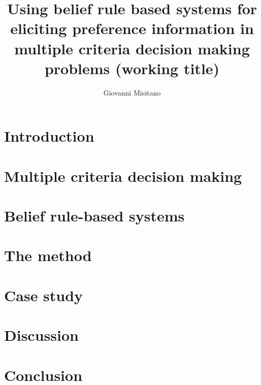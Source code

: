 \documentclass[utf8,english]{gradu3}
\begin{document}
\title{Using belief rule based systems for eliciting preference information in multiple criteria decision making problems (working title)}

\author{Giovanni Misitano}


\maketitle


\mainmatter

\chapter{Introduction}


\chapter{Multiple criteria decision making}


\chapter{Belief rule-based systems}


\chapter{The method}


\chapter{Case study}


\chapter{Discussion}


\chapter{Conclusion}


\printbibliography
\appendix

\end{document}
